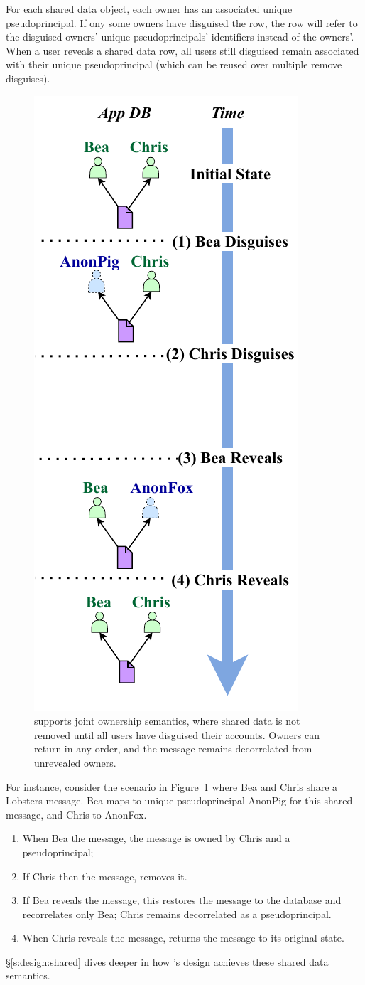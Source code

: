 %
For each shared data object, each owner has an associated unique
pseudoprincipal. If ony some owners have disguised the row, the row will refer
to the disguised owners' unique pseudoprincipals' identifiers instead of the
owners'.
%
When a user reveals a shared data row, all users still disguised remain
associated with their unique pseudoprincipal (which can be reused over multiple
remove disguises).
%

\begin{figure}
    \centering
    \includegraphics[width=.4\textwidth]{figs/shared_hl}
    \caption[\sys supports joint ownership semantics when disguising shared data.]{\sys supports joint ownership semantics, where shared data is not
    removed until all users have disguised their accounts. Owners can return in
    any order, and the message remains decorrelated from unrevealed owners.}
\label{f:shared:hl}
\end{figure}

%
For instance, consider the scenario in Figure~\ref{f:shared:hl} where Bea and
Chris share a Lobsters message. Bea maps to unique pseudoprincipal AnonPig for this
shared message, and Chris to AnonFox.
\begin{enumerate}[nosep]
    \item[(1)] When Bea \xxs the message, the message is owned by
Chris and a pseudoprincipal;
    \item[(2)] If Chris then \xxs the message, \sys removes it.
    \item[(3)] If Bea reveals the message, this restores the message to the database
and recorrelates only Bea; Chris remains decorrelated as a pseudoprincipal.
\item[(4)] When Chris reveals the message, \sys returns
the message to its original state.
\end{enumerate}
%
\S\ref{s:design:shared} dives deeper in how \sys's design achieves these shared
data semantics.


